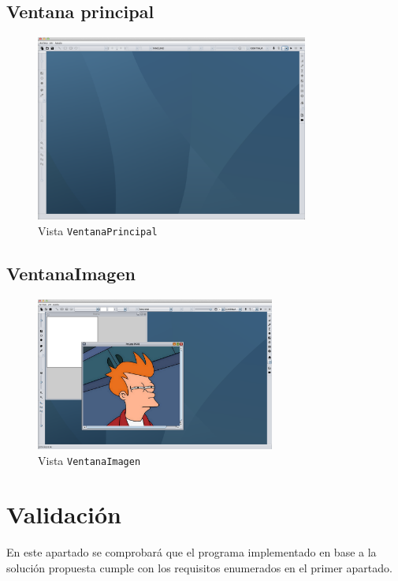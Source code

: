 \subsection{Ventana principal}
\vskip0.3cm
\begin{figure}[H]
 \centering
  \includegraphics[width=0.8\textwidth]{graficos/ventanaPrincipal.png}
 \caption{Vista \texttt{VentanaPrincipal}}
 \label{diseño}
 \end{figure}
 
\subsection{VentanaImagen}
\vskip0.3cm
\begin{figure}[H]
 \centering
  \includegraphics[width=0.7\textwidth]{graficos/ventanaImagen.jpg}
 \caption{Vista \texttt{VentanaImagen}}
 \label{diseño}
 \end{figure}
\clearpage
\section{Validación}
En este apartado se comprobará que el programa implementado en base a la solución propuesta cumple con los requisitos enumerados en el primer apartado.

